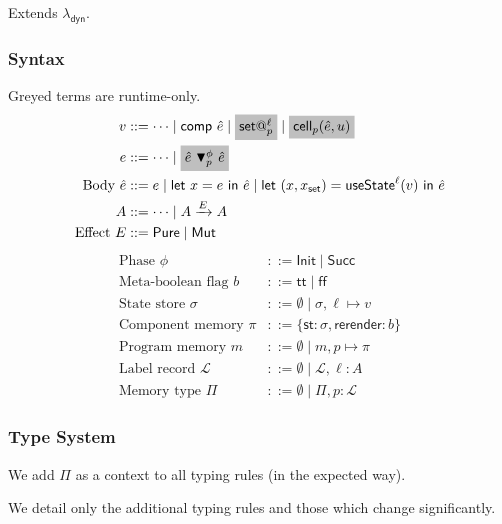 \documentclass{article}
\makeatletter
\newcommand{\mf}[1]{\mathsf{#1}}
\newcommand{\mc}[1]{\mathcal{#1}}
\newcommand{\mb}[1]{\mathbf{#1}}
\newcommand{\semi}{\,;\,}
\newcommand{\mgrey}[1]{\colorbox{lightgray}{$#1$}}
\newcommand{\arrow}[1]{\xrightarrow{#1}}
\newcommand{\tone}{\mb{1}}
\newcommand{\tview}{\mf{View}}
\newcommand{\emut}{\mf{Mut}}
\newcommand{\ttree}{\mf{Tree}}
\newcommand{\vset}[2]{\mf{set}@^{#1}_{#2}}
\newcommand{\Ell}{\mc{L}}
\newcommand{\elet}[3]{\mf{let}\ #1 = #2\ \mf{in}\ #3}
\newcommand{\estate}[4]{\mf{let}\ (#1, #1_{\mf{set}}) = \mf{useState}^{#2}(#3)\ \mf{in}\ #4}
\makeatother
\begin{document}
Extends $\lambda_\mf{dyn}$.

\subsubsection{Syntax}

Greyed terms are runtime-only.
\begin{align*}
v &::= \cdots \mid \mf{comp}\ \hat{e} \mid \mgrey{\vset{\ell}{p}}
\mid \mgrey{\mf{cell}_p(\hat{e}, u)}\\
e &::= \cdots \mid \mgrey{\hat{e}\ \blacktriangledown^\phi_p\ \hat{e}}\\
\text{Body } \hat{e} &::= e \mid \elet{x}{e}{\hat{e}}
\mid \estate{x}{\ell}{v}{\hat{e}}\\
A &::= \cdots \mid A \arrow{E} A\\
\text{Effect } E &::= \mf{Pure} \mid \mf{Mut}
\end{align*}
\begin{align*}
\text{Phase } \phi &::= \mf{Init} \mid \mf{Succ}\\
\text{Meta-boolean flag } b &::= \mf{tt} \mid \mf{ff}\\
\text{State store } \sigma &::= \emptyset \mid \sigma, \ell \mapsto v\\
\text{Component memory } \pi &::= \{\mf{st}: \sigma, \mf{rerender}: b\}\\
\text{Program memory } m &::= \emptyset \mid m, p \mapsto \pi\\
\text{Label record } \Ell &::= \emptyset \mid \Ell, \ell: A\\
\text{Memory type } \Pi &::= \emptyset \mid \Pi, p: \Ell
\end{align*}

\subsubsection{Type System}

We add $\Pi$ as a context to all typing rules (in the expected way).

We detail only the additional typing rules
and those which change significantly.

\fbox{$\Gamma \semi \Pi \vdash v: A$}
\end{document}
